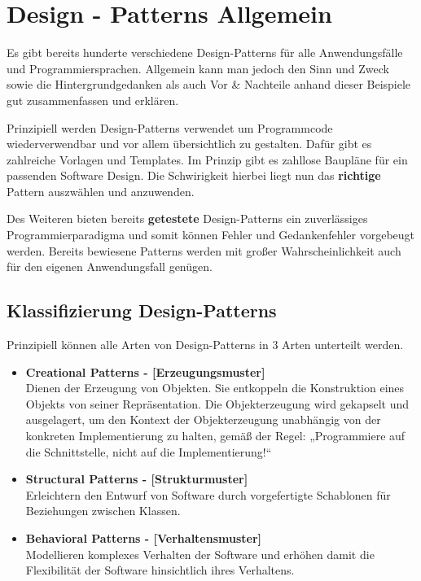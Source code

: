 			
\clearpage


\section{Design - Patterns Allgemein}
Es gibt bereits hunderte verschiedene Design-Patterns für alle Anwendungsfälle und Programmiersprachen. Allgemein kann man jedoch den Sinn und Zweck sowie die Hintergrundgedanken als auch Vor \& Nachteile anhand dieser Beispiele gut zusammenfassen und erklären. \cite{wiki1}

Prinzipiell werden Design-Patterns verwendet um Programmcode wiederverwendbar und vor allem übersichtlich zu gestalten. Dafür gibt es zahlreiche Vorlagen und Templates. Im Prinzip gibt es zahllose Baupläne für ein passenden Software Design. Die Schwirigkeit hierbei liegt nun das \textbf{richtige} Pattern auszwählen und anzuwenden. \cite{wiki1}

Des Weiteren bieten bereits \textbf{getestete} Design-Patterns ein zuverlässiges Programmierparadigma und somit können Fehler und Gedankenfehler vorgebeugt werden. Bereits bewiesene Patterns werden mit großer Wahrscheinlichkeit auch für den eigenen Anwendungsfall genügen.

	\subsection{Klassifizierung Design-Patterns \cite{wiki1}}
	Prinzipiell können alle Arten von Design-Patterns in 3 Arten unterteilt werden.
	\begin{itemize}
		\item \textbf{Creational Patterns - [Erzeugungsmuster]}\\
		Dienen der Erzeugung von Objekten. Sie entkoppeln die Konstruktion eines Objekts von seiner Repräsentation. Die Objekterzeugung wird gekapselt und ausgelagert, um den Kontext der Objekterzeugung unabhängig von der konkreten Implementierung zu halten, gemäß der Regel: „Programmiere auf die Schnittstelle, nicht auf die Implementierung!“
		
		\item \textbf{Structural Patterns - [Strukturmuster]}\\
		Erleichtern den Entwurf von Software durch vorgefertigte Schablonen für Beziehungen zwischen Klassen. 
		
		\item \textbf{Behavioral Patterns - [Verhaltensmuster]}\\
		Modellieren komplexes Verhalten der Software und erhöhen damit die Flexibilität der Software hinsichtlich ihres Verhaltens.
	\end{itemize}
	
